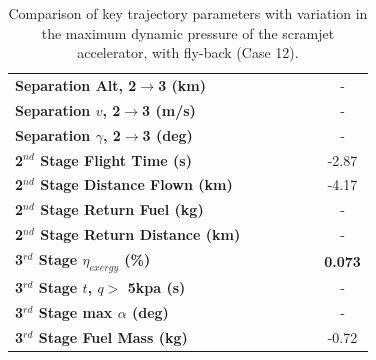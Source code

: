 \begin{table}[ht]
\begin{tabular}{l c c c c c c}
		\textbf{Separation Alt, 2$\rightarrow$3 (km)}
		& \secondthirdSeparationAltqForty
		& \secondthirdSeparationAltqFortyFive
		& \secondthirdSeparationAltqStandard
		& \secondthirdSeparationAltqFiftyFive
		& \secondthirdSeparationAltqSixty
		& -
		\\
		\textbf{Separation $v$, 2$\rightarrow$3 (m/s)}
		& \secondthirdSeparationvqForty
		& \secondthirdSeparationvqFortyFive
		& \secondthirdSeparationvqStandard
		& \secondthirdSeparationvqFiftyFive
		& \secondthirdSeparationvqSixty
		& -
		\\
		\textbf{Separation $\gamma$, 2$\rightarrow$3 (deg)}
		& \secondthirdSeparationgammaqForty
		& \secondthirdSeparationgammaqFortyFive
		& \secondthirdSeparationgammaqStandard
		& \secondthirdSeparationgammaqFiftyFive
		& \secondthirdSeparationgammaqSixty
		& -
		\\
		\textbf{2$^{nd}$ Stage Flight Time (s)}
		& \secondFlightTimeqForty
		& \secondFlightTimeqFortyFive
		& \secondFlightTimeqStandard
		& \secondFlightTimeqFiftyFive
		& \secondFlightTimeqSixty
		&-2.87
		\\
		\textbf{2$^{nd}$ Stage Distance Flown (km)}
		& \SecondDistqForty
		& \SecondDistqFortyFive
		& \SecondDistqStandard
		& \SecondDistqFiftyFive
		& \SecondDistqSixty
		&-4.17
		\\
		\textbf{2$^{nd}$ Stage Return Fuel (kg)}
		& \returnFuelqForty
		& \returnFuelqFortyFive
		& \returnFuelqStandard
		& \returnFuelqFiftyFive
		& \returnFuelqSixty
		& -
		\\
		\textbf{2$^{nd}$ Stage Return Distance (km)}
		& \returnDistqForty
		& \returnDistqFortyFive
		& \returnDistqStandard
		& \returnDistqFiftyFive
		& \returnDistqSixty
		& -
		\\
		\hline 
		\textbf{3$^{rd}$ Stage $\eta_{exergy}$ (\%)}
		& \textbf{\thirddExergyEffqForty}
		& \textbf{\thirddExergyEffqFortyFive}
		& \textbf{\thirddExergyEffqStandard}
		& \textbf{\thirddExergyEffqFiftyFive}
		& \textbf{\thirddExergyEffqSixty}
		& \textbf{0.073}
		\\
		\textbf{3$^{rd}$ Stage $t$, $q >$ 5kpa (s)}
		& \thirdqOverFiveqForty
		& \thirdqOverFiveqFortyFive
		& \thirdqOverFiveqStandard
		& \thirdqOverFiveqFiftyFive
		& \thirdqOverFiveqSixty
		& -
		\\
		\textbf{3$^{rd}$ Stage max $\alpha$ (deg)}
		& \thirdmaxAoAqForty
		& \thirdmaxAoAqFortyFive
		& \thirdmaxAoAqStandard
		& \thirdmaxAoAqFiftyFive
		& \thirdmaxAoAqSixty
		& -
		\\
		\textbf{3$^{rd}$ Stage Fuel Mass (kg)}
		& \thirdmFuelqForty
		& \thirdmFuelqFortyFive
		& \thirdmFuelqStandard
		& \thirdmFuelqFiftyFive
		& \thirdmFuelqSixty
		&-0.72
		\\
		\hline 
	\end{tabular} 
	\caption{Comparison of key trajectory parameters with variation in the maximum dynamic pressure of the scramjet accelerator, with fly-back (Case 12).}
	\label{tab:qvarreturn}
\end{table}


